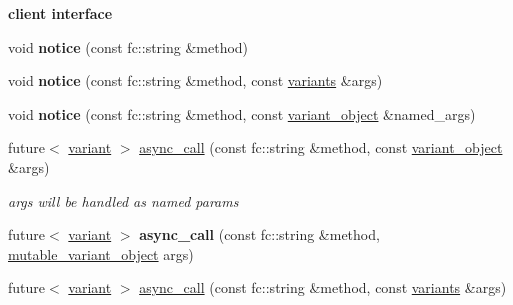 \begin{Indent}\textbf{ client interface}\par
\begin{DoxyCompactItemize}
\item 
\mbox{\label{classfc_1_1rpc_1_1variant__connection_ae7146268ac724f471ce429662bf3f2ee}} 
void {\bfseries notice} (const fc\+::string \&method)
\item 
\mbox{\label{classfc_1_1rpc_1_1variant__connection_ad11f8bd52b6e03532c30f92ecf956845}} 
void {\bfseries notice} (const fc\+::string \&method, const \mbox{\hyperlink{classstd_1_1vector}{variants}} \&args)
\item 
\mbox{\label{classfc_1_1rpc_1_1variant__connection_aea16759934ce56112538c84fa56e005e}} 
void {\bfseries notice} (const fc\+::string \&method, const \mbox{\hyperlink{classfc_1_1variant__object}{variant\+\_\+object}} \&named\+\_\+args)
\item 
\mbox{\label{classfc_1_1rpc_1_1variant__connection_a0d355f51d3a5da55e50d061dd30b85e5}} 
future$<$ \mbox{\hyperlink{classfc_1_1variant}{variant}} $>$ \mbox{\hyperlink{classfc_1_1rpc_1_1variant__connection_a0d355f51d3a5da55e50d061dd30b85e5}{async\+\_\+call}} (const fc\+::string \&method, const \mbox{\hyperlink{classfc_1_1variant__object}{variant\+\_\+object}} \&args)
\begin{DoxyCompactList}\small\item\em args will be handled as named params \end{DoxyCompactList}\item 
\mbox{\label{classfc_1_1rpc_1_1variant__connection_a144008d82d6880166b83bf953684cc34}} 
future$<$ \mbox{\hyperlink{classfc_1_1variant}{variant}} $>$ {\bfseries async\+\_\+call} (const fc\+::string \&method, \mbox{\hyperlink{classfc_1_1mutable__variant__object}{mutable\+\_\+variant\+\_\+object}} args)
\item 
\mbox{\label{classfc_1_1rpc_1_1variant__connection_afdac888194a1ade3bc7612a2052210e3}} 
future$<$ \mbox{\hyperlink{classfc_1_1variant}{variant}} $>$ \mbox{\hyperlink{classfc_1_1rpc_1_1variant__connection_afdac888194a1ade3bc7612a2052210e3}{async\+\_\+call}} (const fc\+::string \&method, const \mbox{\hyperlink{classstd_1_1vector}{variants}} \&args)

\end{DoxyCompactItemize}
\end{Indent}
